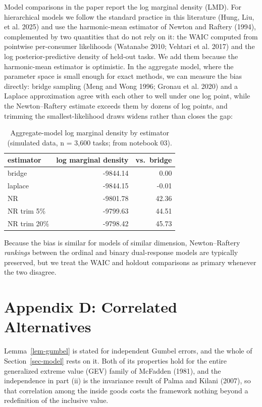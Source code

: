 \documentclass[
  letterpaper,
  DIV=11,
  numbers=noendperiod]{scrartcl}
\theoremstyle{plain}
\theoremstyle{plain}
\theoremstyle{plain}
\theoremstyle{remark}
\begin{document}
Model comparisons in the paper report the log marginal density (LMD).
For hierarchical models we follow the standard practice in this
literature (Hung, Liu, et al. 2025) and use the harmonic-mean estimator
of Newton and Raftery (1994), complemented by two quantities that do not
rely on it: the WAIC computed from pointwise per-consumer likelihoods
(Watanabe 2010; Vehtari et al. 2017) and the log posterior-predictive
density of held-out tasks. We add them because the harmonic-mean
estimator is optimistic. In the aggregate model, where the parameter
space is small enough for exact methods, we can measure the bias
directly: bridge sampling (Meng and Wong 1996; Gronau et al. 2020) and a
Laplace approximation agree with each other to well under one log point,
while the Newton--Raftery estimate exceeds them by dozens of log points,
and trimming the smallest-likelihood draws widens rather than closes the
gap:

\begin{longtable}[]{@{}lrr@{}}

\caption{\label{tbl-lmd-check}Aggregate-model log marginal density by
estimator (simulated data, n = 3,600 tasks; from notebook 03).}

\tabularnewline

\toprule\noalign{}
estimator & log marginal density & vs.~bridge \\
\midrule\noalign{}
\endhead
\bottomrule\noalign{}
\endlastfoot
bridge & -9844.14 & 0.00 \\
laplace & -9844.15 & -0.01 \\
NR & -9801.78 & 42.36 \\
NR trim 5\% & -9799.63 & 44.51 \\
NR trim 20\% & -9798.42 & 45.73 \\

\end{longtable}

Because the bias is similar for models of similar dimension,
Newton--Raftery \emph{rankings} between the ordinal and binary
dual-response models are typically preserved, but we treat the WAIC and
holdout comparisons as primary whenever the two disagree.

\section*{Appendix D: Correlated Alternatives}\label{sec-appendix-gev}

Lemma~\ref{lem-gumbel} is stated for independent Gumbel errors, and the
whole of Section~\ref{sec-model} rests on it. Both of its properties
hold for the entire generalized extreme value (GEV) family of McFadden
(1981), and the independence in part (ii) is the invariance result of
Palma and Kilani (2007), so that correlation among the inside goods
costs the framework nothing beyond a redefinition of the inclusive
value.
\end{document}

